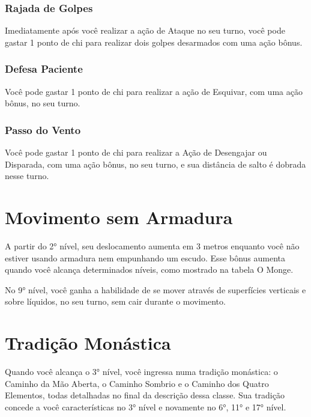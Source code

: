 \begin{multicols}{2}
\subsubsection*{Rajada de Golpes}%
\label{ssub:rajada_de_golpes}

Imediatamente após você realizar a ação de Ataque no seu turno, você pode gastar
1 ponto de chi para realizar dois golpes desarmados com uma ação bônus.

\subsubsection{Defesa Paciente}%
\label{ssub:defesa_paciente}

Você pode gastar 1 ponto de chi para realizar a ação de Esquivar, com uma ação
bônus, no seu turno.

\subsubsection*{Passo do Vento}%
\label{ssub:passo_do_vento}

Você pode gastar 1 ponto de chi para realizar a Ação de Desengajar ou Disparada,
com uma ação bônus, no seu turno, e sua distância de salto é dobrada nesse
turno.

\section*{Movimento sem Armadura}%
\label{sec:movimento_sem_armadura}

A partir do 2° nível, seu deslocamento aumenta em 3 metros enquanto você não
estiver usando armadura nem empunhando um escudo. Esse bônus aumenta quando você
alcança determinados níveis, como mostrado na tabela O Monge.

No 9° nível, você ganha a habilidade de se mover através de superfícies
verticais e sobre líquidos, no seu turno, sem cair durante o movimento.

\section*{Tradição Monástica}%
\label{sec:tradicao_monastica}

Quando você alcança o 3° nível, você ingressa numa tradição monástica: o Caminho
da Mão Aberta, o Caminho Sombrio e o Caminho dos Quatro Elementos, todas
detalhadas no final da descrição dessa classe. Sua tradição concede a você
características no 3° nível e novamente no 6°, 11° e 17° nível.


\end{multicols}
